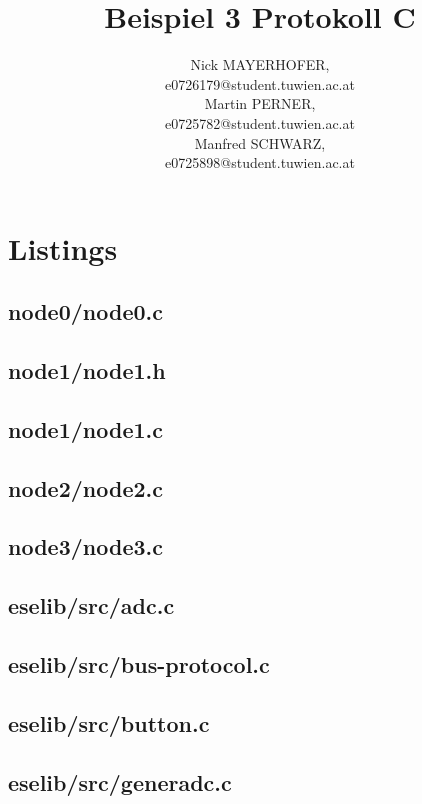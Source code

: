 \documentclass[12pt,a4paper,titlepage,oneside]{article}
\title{Beispiel 3 Protokoll C}
\author{ Nick MAYERHOFER, \matrnr 0726179    \\
        {\small e0726179@student.tuwien.ac.at} \\
	Martin PERNER, \matrnr 0725782    \\
         {\small e0725782@student.tuwien.ac.at} \\
	Manfred SCHWARZ, \matrnr  0725898   \\
         {\small e0725898@student.tuwien.ac.at}
}
\begin{document}
\maketitle

\tableofcontents
\newpage

%


\newpage
\section{Listings}

\subsection{node0/node0.c}

\newpage
\subsection{node1/node1.h}

\newpage
\subsection{node1/node1.c}

\newpage
\subsection{node2/node2.c}

\newpage
\subsection{node3/node3.c}

\newpage
\subsection{eselib/src/adc.c}

\newpage
\subsection{eselib/src/bus-protocol.c}

\newpage
\subsection{eselib/src/button.c}

\newpage
\subsection{eselib/src/generadc.c}

\newpage
\end{document}
